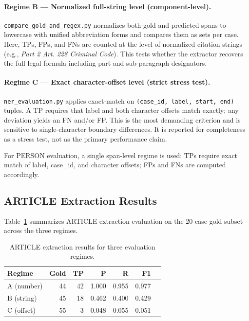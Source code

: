\documentclass[11pt]{article}
\begin{document}
\paragraph{Regime B --- Normalized full-string level (component-level).}

\texttt{compare\_gold\_and\_regex.py} normalizes both gold and predicted spans to lowercase with unified abbreviation forms and compares them as sets per case. Here, TPs, FPs, and FNs are counted at the level of normalized citation strings (e.g., \textit{Part 2 Art. 228 Criminal Code}). This tests whether the extractor recovers the full legal formula including part and sub-paragraph designators.

\paragraph{Regime C --- Exact character-offset level (strict stress test).}

\texttt{ner\_evaluation.py} applies exact-match on \texttt{(case\_id, label, start, end)} tuples. A TP requires that label and both character offsets match exactly; any deviation yields an FN and/or FP. This is the most demanding criterion and is sensitive to single-character boundary differences. It is reported for completeness as a stress test, not as the primary performance claim.

For PERSON evaluation, a single span-level regime is used: TPs require exact match of label, case\_id, and character offsets; FPs and FNs are computed accordingly.

\subsection{ARTICLE Extraction Results}

Table~\ref{tab:article} summarizes ARTICLE extraction evaluation on the 20-case gold subset across the three regimes.

\begin{table}[t]
\centering
\begin{tabular}{lrrrrrr}
\hline
Regime & Gold & TP & P & R & F1 \\
\hline
A (number) & 44 & 42 & 1.000 & 0.955 & 0.977 \\
B (string) & 45 & 18 & 0.462 & 0.400 & 0.429 \\
C (offset) & 55 & 3 & 0.048 & 0.055 & 0.051 \\
\hline
\end{tabular}
\caption{ARTICLE extraction results for three evaluation regimes.}
\label{tab:article}
\end{table}
\end{document}
